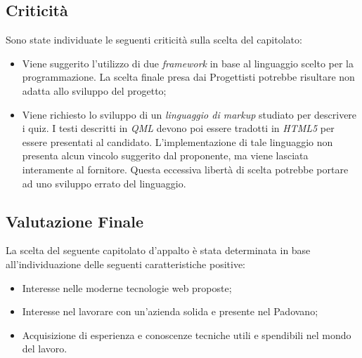 \subsection{Criticità}
Sono state individuate le seguenti criticità sulla scelta del capitolato:
\begin{itemize}
\item Viene suggerito l'utilizzo di due \textit{framework} in base al linguaggio scelto per la programmazione. La scelta finale presa dai Progettisti potrebbe risultare non adatta allo sviluppo del progetto;
\item Viene richiesto lo sviluppo di un \textit{linguaggio di markup} studiato per descrivere i quiz. I testi descritti in \textit{QML} devono poi essere tradotti in \textit{HTML5} per essere presentati al candidato. L'implementazione di tale linguaggio non presenta alcun vincolo suggerito dal proponente, ma viene lasciata interamente al fornitore. Questa eccessiva libertà di scelta potrebbe portare ad uno sviluppo errato del linguaggio.
\end{itemize}

\subsection{Valutazione Finale}
La scelta del seguente capitolato d'appalto è stata determinata in base all'individuazione delle seguenti caratteristiche positive:
\begin{itemize} 
\item Interesse nelle moderne tecnologie web proposte;
\item Interesse nel lavorare con un'azienda solida e presente nel Padovano;
\item Acquisizione di esperienza e conoscenze tecniche utili e spendibili nel mondo del lavoro.
\end{itemize}
